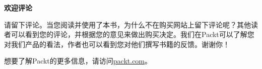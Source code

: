 \hspace*{\fill} \par %
\textbf{欢迎评论}

请留下评论。当您阅读并使用了本书，为什么不在购买网站上留下评论呢？其他读者可以看到您的评论，并根据您的意见来做出购买决定。我们在Packt可以了解您对我们产品的看法，作者也可以看到您对他们撰写书籍的反馈。谢谢你！\par

想要了解Packt的更多信息，请访问\url{packt.com}。\par

\newpage


















